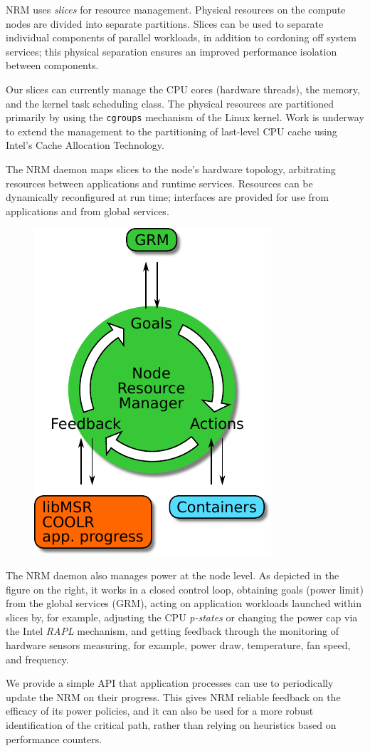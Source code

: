 NRM uses \emph{slices} for resource management.  Physical resources on the
compute nodes are divided into separate partitions.  Slices can be used to
separate individual components of parallel workloads, in addition to
cordoning off system services; this physical separation ensures an improved
performance isolation between components.

Our slices can currently manage the CPU cores (hardware threads), the
memory, and the kernel task scheduling class.  The physical
resources are partitioned primarily by using the \texttt{cgroups} mechanism
of the Linux kernel.  Work is underway to extend the management to 
the partitioning of last-level CPU cache using Intel's Cache Allocation
Technology.

The NRM daemon maps slices to the node's hardware topology, arbitrating
resources between applications and runtime services. Resources can be
dynamically reconfigured at run time; interfaces are provided for use from
applications and from global services.

\begin{figure}
\vspace{-12pt}\includegraphics[width=.18\textwidth]{projects/2.3.1-PMR/2.3.1.19-Argo-PowerSteering/nrm-loop}
\end{figure}
The NRM daemon also manages power at the node level.  As depicted in the
figure on the right, it works in a closed control loop, obtaining goals
(power limit) from the global services (GRM), acting on application
workloads launched within slices by, for example, adjusting the CPU
\emph{p-states} or changing the power cap via the Intel \emph{RAPL}
mechanism, and getting feedback through the monitoring of hardware sensors
measuring, for example, power draw, temperature, fan speed, and frequency.

We provide a simple API that application processes can use to periodically
update the NRM on their progress.  This gives NRM reliable feedback on the
efficacy of its power policies, and it can also be used for a more robust
identification of the critical path, rather than relying on heuristics
based on performance counters.

